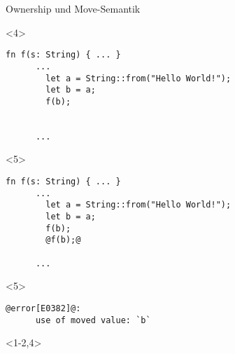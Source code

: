 \begin{frame}[fragile]{Ownership und Move-Semantik}

  \begin{onlyenv}<4> {
    \begin{lstlisting}[frame=single,style=base]
      fn f(s: String) { ... }
      ...
        let a = String::from("Hello World!");
        let b = a;
        f(b);


      ...\end{lstlisting}
  }
  \end{onlyenv}


  \begin{onlyenv}<5> {
    \begin{lstlisting}[frame=single,style=base]
      fn f(s: String) { ... }
      ...
        let a = String::from("Hello World!");
        let b = a;
        f(b);
        @f(b);@

      ...\end{lstlisting}
  }
  \end{onlyenv}

  \begin{onlyenv}<5> {
    \begin{lstlisting}[frame=single,style=base]
      @error[E0382]@:
      use of moved value: `b`\end{lstlisting}
  }
  \end{onlyenv}


  \begin{onlyenv}<1-2,4> {
    \begin{lstlisting}[frame=single,style=base]

    \end{lstlisting}
  }
  \end{onlyenv}

\end{frame}